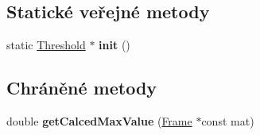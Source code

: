\subsection*{Statické veřejné metody}
\begin{DoxyCompactItemize}
\item 
\hypertarget{class_ar_pipe_1_1_threshold_a0e2a97fce2b23771a6fbbc1abd379dca}{static \hyperlink{class_ar_pipe_1_1_threshold}{Threshold} $\ast$ {\bfseries init} ()}\label{d8/df3/class_ar_pipe_1_1_threshold_a0e2a97fce2b23771a6fbbc1abd379dca}

\end{DoxyCompactItemize}
\subsection*{Chráněné metody}
\begin{DoxyCompactItemize}
\item 
\hypertarget{class_ar_pipe_1_1_threshold_a26d5f2edf5040d67bc9dcf2630f2e6d4}{double {\bfseries get\-Calced\-Max\-Value} (\hyperlink{class_ar_pipe_1_1_frame}{Frame} $\ast$const mat)}\label{d8/df3/class_ar_pipe_1_1_threshold_a26d5f2edf5040d67bc9dcf2630f2e6d4}

\end{DoxyCompactItemize}
